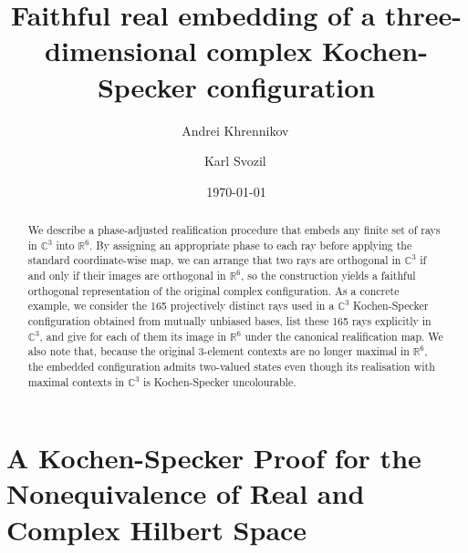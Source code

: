 \documentclass[%
  reprint,
  superscriptaddress,
  amsmath,amssymb,
  pra,
  floatfix,
  longbibliography
]{revtex4-2}
\begin{document}
\title{Faithful real embedding of a three-dimensional complex Kochen-Specker configuration}

\author{Andrei Khrennikov\,}


\author{Karl Svozil\,}


\date{\today}

\begin{abstract}
We describe a phase-adjusted realification procedure that embeds any finite set of rays in $\mathbb{C}^3$ into $\mathbb{R}^6$. By assigning an appropriate phase to each ray before applying the standard coordinate-wise map, we can arrange that two rays are orthogonal in $\mathbb{C}^3$ if and only if their images are orthogonal in $\mathbb{R}^6$, so the construction yields a faithful orthogonal representation of the original complex configuration. As a concrete example, we consider the 165 projectively distinct rays used in a $\mathbb{C}^3$ Kochen-Specker configuration obtained from mutually unbiased bases, list these 165 rays explicitly in $\mathbb{C}^3$, and give for each of them its image in $\mathbb{R}^6$ under the canonical realification map. We also note that, because the original 3-element contexts are no longer maximal in $\mathbb{R}^6$, the embedded configuration admits two-valued states even though its realisation with maximal contexts in $\mathbb{C}^3$ is Kochen-Specker uncolourable.
\end{abstract}

\maketitle

\section{A Kochen-Specker Proof for the Nonequivalence of Real and Complex Hilbert Space}
\end{document}
